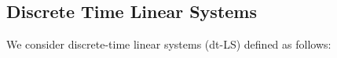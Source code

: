 \documentclass[sigconf]{acmart}
\begin{document}


\subsection{Discrete Time Linear Systems}\label{subsec:discrete-time-linear-systems}

We consider discrete-time linear systems (dt-LS) defined as follows:
\end{document}
